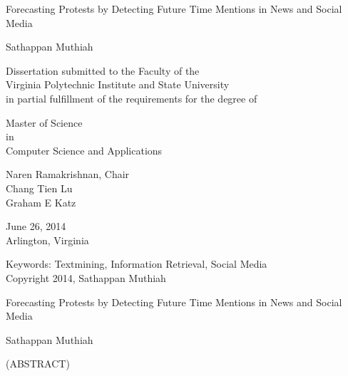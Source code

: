 \documentclass[10pt]{report}
\begin{document}
\thispagestyle{empty}

\newcommand{\then}{\Rightarrow}
\newcommand{\softor}{\operatornamewithlimits{\tilde{\vee}}}
\newcommand{\softand}{\operatornamewithlimits{\tilde{\wedge}}}
\newcommand{\softthen}{\operatornamewithlimits{\tilde{\then}}}
\newcommand{\softneg}{\operatornamewithlimits{\tilde{\neg}}}

\begin{center}

{\Large
    Forecasting Protests by Detecting Future Time Mentions in News and Social Media
}

\vfill

Sathappan Muthiah
\vfill

Dissertation submitted to the Faculty of the \\
Virginia Polytechnic Institute and State University \\
in partial fulfillment of the requirements for the degree of

\vfill

Master of Science\\
in \\
Computer Science and Applications

\vfill

Naren Ramakrishnan, Chair \\
Chang Tien Lu \\
Graham E Katz \\

\vfill

June 26, 2014 \\
Arlington, Virginia

\vfill

Keywords: Textmining, Information Retrieval, Social Media
\\
Copyright 2014, Sathappan Muthiah

\end{center}

\pagebreak

\thispagestyle{empty}
\begin{center}

{\large Forecasting Protests by Detecting Future Time Mentions in News and Social Media
}

\vfill

Sathappan Muthiah

\vfill

(ABSTRACT)

\vfill

\end{center}
\end{document}
